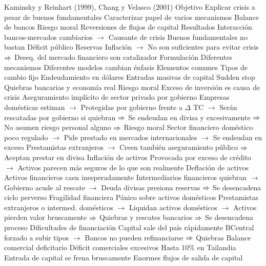 \documentclass{nuevotema}
\begin{document}
\begin{esquemal}
				\4[] Kaminsky y Reinhart (1999), Chang y Velasco (2001)
			\3 Objetivo
				\4 Explicar crisis a pesar de buenos fundamentales
				\4 Caracterizar papel de varios mecanismos
				\4[] Balance de bancos
				\4[] Riesgo moral
				\4[] Reversiones de flujos de capital
			\3 Resultados
				\4 Interacción bancos-mercados cambiarios
				\4[] $\to$ Causante de crisis
				\4 Buenos fundamentales no bastan
				\4[] Déficit público
				\4[] Reservas
				\4[] Inflación
				\4[] $\to$ No son suficientes para evitar crisis
				\4[] $\Rightarrow$ Deseq. del mercado financiero son catalizador
		\2 Formulación
			\3 Diferentes mecanismos
				\4 Diferentes modelos cambian énfasis
				\4 Elementos comunes
				\4[] Tipos de cambio fijo
				\4[] Endeudamiento en dólares
				\4[] Entradas masivas de capital
				\4[] Sudden stop
				\4[] Quiebras bancarias y economía real
			\3 Riesgo moral
				\4 Exceso de inversión es causa de crisis
				\4 Aseguramiento implícito de sector privado por gobierno
				\4[] Empresas domésticas estiman
				\4[] $\to$ Protegidas por gobierno frente a $\Delta$ TC
				\4[] $\to$ Serán rescatadas por gobierno si quiebran
				\4[] $\Rightarrow$ Se endeudan en divisa y excesivamente
				\4[] $\Rightarrow$ No asumen riesgo personal alguno
				\4[] $\Rightarrow$ Riesgo moral
				\4[] Sector financiero doméstico poco regulado
				\4[] $\to$ Pide prestado en mercados internacionales
				\4[] $\to$ Se endeudan en exceso
				\4[] Prestamistas extranjeros
				\4[] $\to$ Creen también aseguramiento público
				\4[] $\Rightarrow$ Aceptan prestar en divisa
				\4 Inflación de activos
				\4[] Provocada por exceso de crédito
				\4[] $\to$ Activos parecen más seguros de lo que son realmente
				\4 Deflación de activos
				\4[] Activos financieros caen inesperadamente
				\4[] Intermediarios financieros quiebran
				\4[] $\to$ Gobierno acude al rescate
				\4[] $\to$ Deuda divisas presiona reservas
				\4[] $\Rightarrow$ Se desencadena ciclo perverso
			\3 Fragilidad financiera
				\4 Pánico sobre activos domésticos
				\4[] Prestamistas extranjeros o intermed. domésticos
				\4[] $\to$ Liquidan activos domésticos
				\4[] $\to$ Activos pierden valor bruscamente
				\4[] $\Rightarrow$ Quiebras y rescates bancarios
				\4[] $\Rightarrow$ Se desencadena proceso
				\4 Dificultades de financiación
				\4[] Capital sale del país rápidamente
				\4[] BCentral forzado a subir tipos
				\4[] $\to$ Bancos no pueden refinanciarse
				\4[] $\Rightarrow$ Quiebras
			\3 Balance comercial deficitario
				\4 Déficit comerciales excesivos
				\4[] Hasta 10\% en Tailandia
				\4 Entrada de capital se frena bruscamente
				\4[] Enormes flujos de salida de capital

\end{esquemal}
\end{document}
